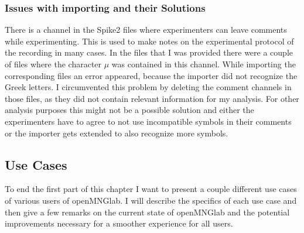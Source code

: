 \subsubsection{Issues with importing and their Solutions}
There is a channel in the Spike2 files where experimenters can leave comments while experimenting. This is used to make notes on the experimental protocol of the recording in many cases. In the files that I was provided there were a couple of files where the character $\mu$ was contained in this channel. While importing the corresponding files an error appeared, because the importer did not recognize the Greek letters. I circumvented this problem by deleting the comment channels in those files, as they did not contain relevant information for my analysis. For other analysis purposes this might not be a possible solution and either the experimenters have to agree to not use incompatible symbols in their comments or the importer gets extended to also recognize more symbols.

\subsection{Use Cases}
To end the first part of this chapter I want to present a couple different use cases of various users of openMNGlab. I will describe the specifics of each use case and then give a few remarks on the current state of openMNGlab and the potential improvements necessary for a smoother experience for all users.

